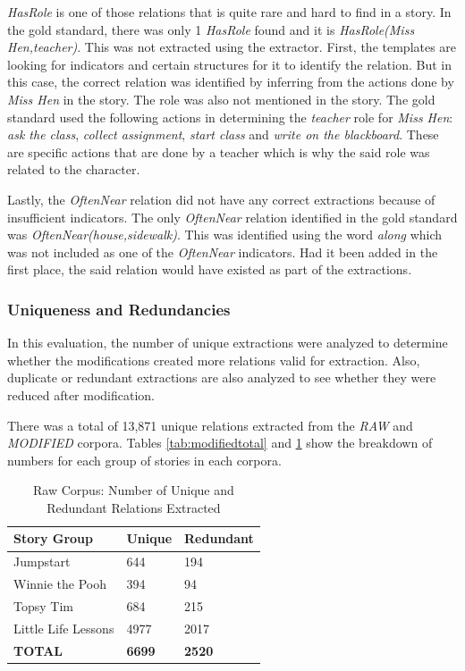 \textit{HasRole} is one of those relations that is quite rare and hard to find in a story. In the gold standard, there was only 1 \textit{HasRole} found and it is \textit{HasRole(Miss Hen,teacher)}. This was not extracted using the extractor. First, the templates are looking for indicators and certain structures for it to identify the relation. But in this case, the correct relation was identified by inferring from the actions done by \textit{Miss Hen} in the story. The role was also not mentioned in the story. The gold standard used the following actions in determining the \textit{teacher} role for \textit{Miss Hen}: \textit{ask the class}, \textit{collect assignment}, \textit{start class} and \textit{write on the blackboard}. These are specific actions that are done by a teacher which is why the said role was related to the character.

Lastly, the \textit{OftenNear} relation did not have any correct extractions because of insufficient indicators. The only \textit{OftenNear} relation identified in the gold standard was \textit{OftenNear(house,sidewalk)}. This was identified using the word \textit{along} which was not included as one of the \textit{OftenNear} indicators. Had it been added in the first place, the said relation would have existed as part of the extractions.  

\subsubsection{Uniqueness and Redundancies}

In this evaluation, the number of unique extractions were analyzed to determine whether the modifications created more relations valid for extraction. Also, duplicate or redundant extractions are also analyzed to see whether they were reduced after modification.

There was a total of 13,871 unique relations extracted from the \textit{RAW} and \textit{MODIFIED} corpora. Tables \ref{tab:modifiedtotal} and \ref{tab:rawtotal} show the breakdown of numbers for each group of stories in each corpora.

\begin{table}[H]   %
\centering
\caption{Raw Corpus: Number of Unique and Redundant Relations Extracted} \vspace{0.25em}
\begin{tabular}{|p{4cm}|p{3cm}|p{3cm}|} \hline
\textbf{Story Group} & \textbf{Unique} & \textbf{Redundant} \\ \hline
Jumpstart & 644 & 194 \\ \hline
Winnie the Pooh & 394 & 94 \\ \hline
Topsy Tim & 684 & 215 \\ \hline
Little Life Lessons & 4977 & 2017 \\ \hline
\textbf{TOTAL} & \textbf{6699} & \textbf{2520} \\ \hline
\end{tabular}
\label{tab:rawtotal}
\end{table}

